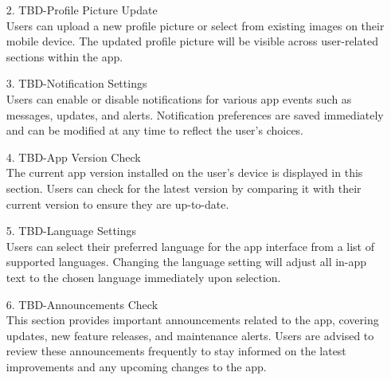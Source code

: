 \documentclass[conference]{IEEEtran}
\begin{document}
\begin{enumerate}
\begin{itemize}
\begin{itemize}
    \begin{enumerate} 
        \item[2.] TBD-Profile Picture Update \\
         Users can upload a new profile picture or select from existing images on their mobile device. The updated profile picture will be visible across user-related sections within the app. \\
    \end{enumerate}

    \begin{enumerate}  
        \item[3.] TBD-Notification Settings \\
        Users can enable or disable notifications for various app events such as messages, updates, and alerts. Notification preferences are saved immediately and can be modified at any time to reflect the user’s choices. \\
    \end{enumerate}

    \begin{enumerate}    
        \item[4.] TBD-App Version Check \\ 
             The current app version installed on the user’s device is displayed in this section. Users can check for the latest version by comparing it with their current version to ensure they are up-to-date. \\
    \end{enumerate}

    \begin{enumerate} 
        \item[5.] TBD-Language Settings \\
        Users can select their preferred language for the app interface from a list of supported languages. Changing the language setting will adjust all in-app text to the chosen language immediately upon selection. \\
    \end{enumerate}

    \begin{enumerate}    
        \item[6.] TBD-Announcements Check \\
        This section provides important announcements related to the app, covering updates, new feature releases, and maintenance alerts. Users are advised to review these announcements frequently to stay informed on the latest improvements and any upcoming changes to the app. \\
    \end{enumerate}




\end{itemize}
\end{itemize}
\end{enumerate}
\end{document}
